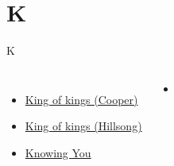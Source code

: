 \documentclass{beamer}
\begin{document}
\section{K}

\begin{frame}{K}
\begin{columns}
        \begin{itemize}
    \item \hyperlink{King of kings[](Cooper)}{King of kings (Cooper)} \phantom{ 1 1 1 1 1 1 1}
    \item \hyperlink{King of kings[](Hillsong)}{King of kings (Hillsong)} \phantom{ 1 1 1 1 1 1}
    \item \hyperlink{Knowing You['All I once held dear']}{Knowing You } \phantom{ 1 1 1 1 1 1 1 1 1 1 1 1}
\end{itemize}
        \begin{itemize}
            \item[] \phantom{1}\end{itemize}


\end{columns}

\end{frame}
\end{document}

